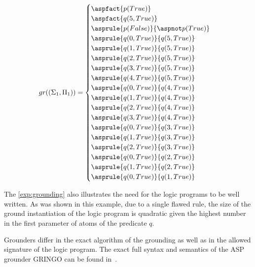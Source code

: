\begin{example}
    \begin{equation*}
        gr((\Sigma_1, \Pi_1)) =
            \begin{cases}
                \aspfact{p(True)}\\
                \aspfact{q(5, True)}\\
                \asprule{p(False)}{\aspnot p(True)}\\
                \asprule{q(0, True)}{q(5, True)}\\
                \asprule{q(1, True)}{q(5, True)}\\
                \asprule{q(2, True)}{q(5, True)}\\
                \asprule{q(3, True)}{q(5, True)}\\
                \asprule{q(4, True)}{q(5, True)}\\
                \asprule{q(0, True)}{q(4, True)}\\
                \asprule{q(1, True)}{q(4, True)}\\
                \asprule{q(2, True)}{q(4, True)}\\
                \asprule{q(3, True)}{q(4, True)}\\
                \asprule{q(0, True)}{q(3, True)}\\
                \asprule{q(1, True)}{q(3, True)}\\
                \asprule{q(2, True)}{q(3, True)}\\
                \asprule{q(0, True)}{q(2, True)}\\
                \asprule{q(1, True)}{q(2, True)}\\
                \asprule{q(0, True)}{q(1, True)}\\
            \end{cases}
    \end{equation*}
\end{example}

The \cref{exp:grounding} also illustrates the need for the logic programs
to be well written. As was shown in this example, due to a single flawed rule,
the size of the ground instantiation of the logic program is quadratic
given the highest number in the first parameter of atoms of the predicate $q$.

Grounders differ in the exact algorithm of the grounding as well as in the
allowed signature of the logic program.
The exact full syntax and semantics
of the ASP grounder GRINGO can be found in~\cite{GEBSER_2015}.


